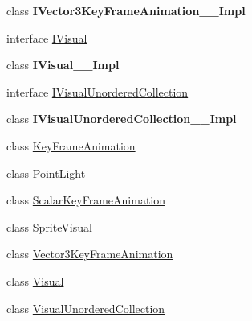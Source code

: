 \begin{DoxyCompactItemize}
\item 
class {\bfseries I\+Vector3\+Key\+Frame\+Animation\+\_\+\+\_\+\+Impl}
\item 
interface \hyperlink{interface_windows_1_1_u_i_1_1_composition_1_1_i_visual}{I\+Visual}
\item 
class {\bfseries I\+Visual\+\_\+\+\_\+\+Impl}
\item 
interface \hyperlink{interface_windows_1_1_u_i_1_1_composition_1_1_i_visual_unordered_collection}{I\+Visual\+Unordered\+Collection}
\item 
class {\bfseries I\+Visual\+Unordered\+Collection\+\_\+\+\_\+\+Impl}
\item 
class \hyperlink{class_windows_1_1_u_i_1_1_composition_1_1_key_frame_animation}{Key\+Frame\+Animation}
\item 
class \hyperlink{class_windows_1_1_u_i_1_1_composition_1_1_point_light}{Point\+Light}
\item 
class \hyperlink{class_windows_1_1_u_i_1_1_composition_1_1_scalar_key_frame_animation}{Scalar\+Key\+Frame\+Animation}
\item 
class \hyperlink{class_windows_1_1_u_i_1_1_composition_1_1_sprite_visual}{Sprite\+Visual}
\item 
class \hyperlink{class_windows_1_1_u_i_1_1_composition_1_1_vector3_key_frame_animation}{Vector3\+Key\+Frame\+Animation}
\item 
class \hyperlink{class_windows_1_1_u_i_1_1_composition_1_1_visual}{Visual}
\item 
class \hyperlink{class_windows_1_1_u_i_1_1_composition_1_1_visual_unordered_collection}{Visual\+Unordered\+Collection}
\end{DoxyCompactItemize}
